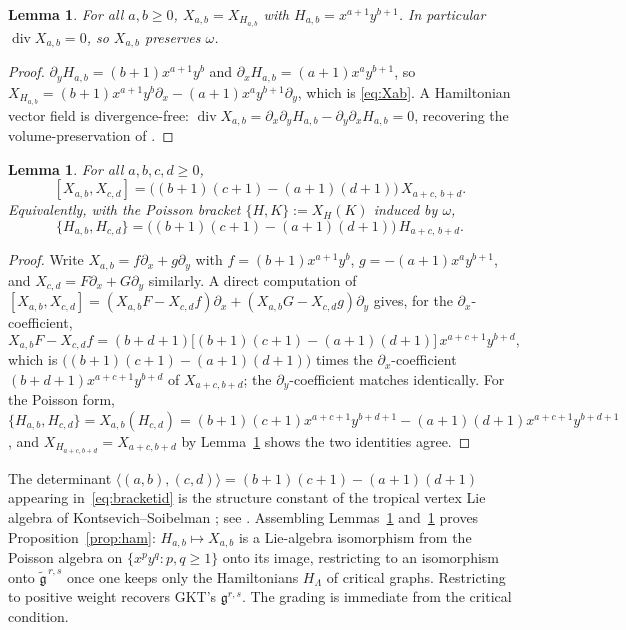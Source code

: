 \documentclass[11pt]{amsart}
\newtheorem{lemma}[theorem]{Lemma}
\theoremstyle{definition}
\theoremstyle{remark}
\newcommand{\gfrak}{\mathfrak{g}}
\begin{document}
\begin{lemma}
\label{lem:hamvf}
For all $a,b\geq0$, $X_{a,b}=X_{H_{a,b}}$ with $H_{a,b}=x^{a+1}y^{b+1}$. In
particular $\operatorname{div}X_{a,b}=0$, so $X_{a,b}$ preserves $\omega$.
\end{lemma}

\begin{proof}
$\partial_{y}H_{a,b}=(b+1)x^{a+1}y^{b}$ and
$\partial_{x}H_{a,b}=(a+1)x^{a}y^{b+1}$, so
$X_{H_{a,b}}=(b+1)x^{a+1}y^{b}\partial_{x}-(a+1)x^{a}y^{b+1}\partial_{y}$, which is
\eqref{eq:Xab}. A Hamiltonian vector field is divergence-free:
$\operatorname{div}X_{a,b}=\partial_{x}\partial_{y}H_{a,b}-\partial_{y}\partial_{x}H_{a,b}=0$,
recovering the volume-preservation of \cite[p.~89]{GKT}.
\end{proof}

\begin{lemma}
\label{lem:bracket}
For all $a,b,c,d\geq0$,
\begin{equation}
\label{eq:bracketid}
[X_{a,b},X_{c,d}]=\bigl((b+1)(c+1)-(a+1)(d+1)\bigr)\,X_{a+c,\,b+d}.
\end{equation}
Equivalently, with the Poisson bracket $\{H,K\}:=X_{H}(K)$ induced by $\omega$,
\[
\{H_{a,b},H_{c,d}\}=\bigl((b+1)(c+1)-(a+1)(d+1)\bigr)\,H_{a+c,\,b+d}.
\]
\end{lemma}

\begin{proof}
Write $X_{a,b}=f\partial_{x}+g\partial_{y}$ with $f=(b+1)x^{a+1}y^{b}$,
$g=-(a+1)x^{a}y^{b+1}$, and $X_{c,d}=F\partial_{x}+G\partial_{y}$ similarly. A
direct computation of
$[X_{a,b},X_{c,d}]=(X_{a,b}F-X_{c,d}f)\partial_{x}+(X_{a,b}G-X_{c,d}g)\partial_{y}$
gives, for the $\partial_{x}$-coefficient,
\[
X_{a,b}F-X_{c,d}f
=(b+d+1)\bigl[(b+1)(c+1)-(a+1)(d+1)\bigr]\,x^{a+c+1}y^{b+d},
\]
which is $\bigl((b+1)(c+1)-(a+1)(d+1)\bigr)$ times the $\partial_{x}$-coefficient
$(b+d+1)x^{a+c+1}y^{b+d}$ of $X_{a+c,b+d}$; the $\partial_{y}$-coefficient matches
identically. For the Poisson form,
$\{H_{a,b},H_{c,d}\}=X_{a,b}(H_{c,d})
=(b+1)(c+1)x^{a+c+1}y^{b+d+1}-(a+1)(d+1)x^{a+c+1}y^{b+d+1}$, and
$X_{H_{a+c,b+d}}=X_{a+c,b+d}$ by Lemma~\ref{lem:hamvf} shows the two identities
agree.
\end{proof}

The determinant $\langle(a,b),(c,d)\rangle=(b+1)(c+1)-(a+1)(d+1)$ appearing
in~\eqref{eq:bracketid} is the structure constant of the tropical vertex Lie
algebra of Kontsevich--Soibelman \cite{KS06}; see \cite{Gross10}. Assembling
Lemmas~\ref{lem:hamvf} and~\ref{lem:bracket} proves Proposition~\ref{prop:ham}:
$H_{a,b}\mapsto X_{a,b}$ is a Lie-algebra isomorphism from the Poisson algebra on
$\{x^{p}y^{q}:p,q\geq1\}$ onto its image, restricting to an isomorphism onto
$\widetilde{\gfrak}^{\,r,s}$ once one keeps only the Hamiltonians
$H_{\Lambda}$ of critical graphs. Restricting to positive weight recovers
GKT's $\mathfrak g^{r,s}$. The grading is immediate from the critical
condition.
\end{document}
